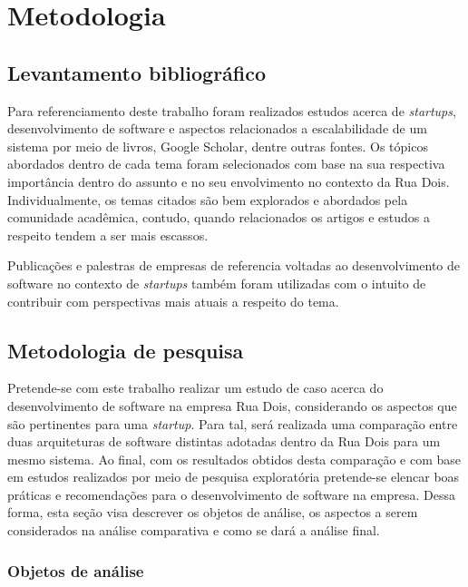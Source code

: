 \chapter{Metodologia}
\label{sec:Metodologia}

\section{Levantamento bibliográfico}

Para referenciamento deste trabalho foram realizados estudos acerca de
\textit{startups}, desenvolvimento de software e aspectos relacionados
a escalabilidade de um sistema por meio de livros, Google Scholar, dentre
outras fontes. Os tópicos abordados dentro de cada tema foram selecionados
com base na sua respectiva importância dentro do assunto e no seu envolvimento
no contexto da Rua Dois. Individualmente, os temas citados são bem explorados e
abordados pela comunidade acadêmica, contudo, quando relacionados os artigos e
estudos a respeito tendem a ser mais escassos.

Publicações e palestras de empresas de referencia voltadas ao desenvolvimento de
software no contexto de \textit{startups} também foram utilizadas com o intuito de
contribuir com perspectivas mais atuais a respeito do tema.

\section{Metodologia de pesquisa}
\label{sec:MetodologiaPesquisa}

Pretende-se com este trabalho realizar um estudo de caso acerca do desenvolvimento
de software na empresa Rua Dois, considerando os aspectos que são pertinentes para
uma \textit{startup}. Para tal, será realizada uma comparação entre duas arquiteturas
de software distintas adotadas dentro da Rua Dois para um mesmo sistema. Ao final,
com os resultados obtidos desta comparação e com base em estudos realizados por meio
de pesquisa exploratória pretende-se elencar boas práticas e recomendações para o
desenvolvimento de software na empresa. Dessa forma, esta seção visa descrever
os objetos de análise, os aspectos a serem considerados na análise comparativa e
como se dará a análise final.

\subsection{Objetos de análise}

